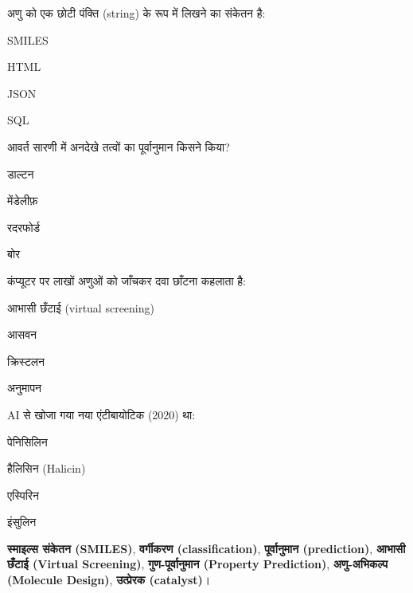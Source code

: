 \begin{mcq}
  \item अणु को एक छोटी पंक्ति (string) के रूप में लिखने का संकेतन है:
    \begin{choices}\item SMILES \item HTML \item JSON \item SQL\end{choices}
  \item आवर्त सारणी में अनदेखे तत्वों का पूर्वानुमान किसने किया?
    \begin{choices}\item डाल्टन \item मेंडेलीफ़ \item रदरफोर्ड \item बोर\end{choices}
  \item कंप्यूटर पर लाखों अणुओं को जाँचकर दवा छाँटना कहलाता है:
    \begin{choices}\item आभासी छँटाई (virtual screening) \item आसवन
      \item क्रिस्टलन \item अनुमापन\end{choices}
  \item AI से खोजा गया नया एंटीबायोटिक (2020) था:
    \begin{choices}\item पेनिसिलिन \item हैलिसिन (Halicin)
      \item एस्पिरिन \item इंसुलिन\end{choices}
\end{mcq}

\begin{mukhyashabd}
\textbf{स्माइल्स संकेतन (SMILES)}, \textbf{वर्गीकरण (classification)},
\textbf{पूर्वानुमान (prediction)}, \textbf{आभासी छँटाई (Virtual Screening)},
\textbf{गुण-पूर्वानुमान (Property Prediction)}, \textbf{अणु-अभिकल्प (Molecule Design)},
\textbf{उत्प्रेरक (catalyst)}।
\end{mukhyashabd}
